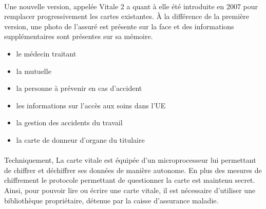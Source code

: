 \paragraph{}
Une nouvelle version, appelée Vitale 2 a quant à elle été introduite en
2007 pour remplacer progressivement les cartes existantes.  À la différence
de la première version, une photo de l'assuré est présente sur la face et
des informations supplémentaires sont présentes sur sa mémoire.

\begin{itemize}
    \item le médecin traitant
    \item la mutuelle
    \item la personne à prévenir en cas d'accident
    \item les informations sur l'accès aux soins dans l'UE
    \item la gestion des accidents du travail
    \item la carte de donneur d'organe du titulaire
\end{itemize}

\paragraph{}
Techniquement, La carte vitale est équipée d'un microprocesseur lui
permettant de chiffrer et déchiffrer ses données de manière autonome. En
plus des mesures de chiffrement le protocole permettant de questionner la
carte est maintenu secret. Ainsi, pour pouvoir lire ou écrire une carte
vitale, il est nécessaire d'utiliser une bibliothèque propriétaire, détenue
par la caisse d'assurance maladie.
